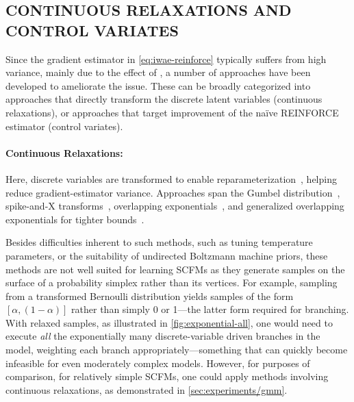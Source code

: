 \vspace*{-1ex}
\subsection{CONTINUOUS RELAXATIONS AND CONTROL VARIATES}
\vspace*{-1ex}
\label{sec:background/control-variates}

Since the gradient estimator in \cref{eq:iwae-reinforce} typically suffers from high variance, mainly due to the effect of , a number of approaches have been developed to ameliorate the issue.
%
These can be broadly categorized into approaches that directly transform the discrete latent variables (continuous relaxations), or approaches that target improvement of the na\"ive \acrshort{REINFORCE} estimator (control variates).

\paragraph{Continuous Relaxations:}%
%
Here, discrete variables are transformed to enable reparameterization~\citep{kingma2014auto,rezende2014stochastic}, helping reduce gradient-estimator variance.
%
Approaches span the Gumbel distribution~\citep{maddison2017concrete,jang2017categorical}, spike-and-X transforms~\citep{rolfe2016dvae}, overlapping exponentials~\citep{vahdat2018dvaepp}, and generalized overlapping exponentials for tighter bounds~\citep{vahdat2018dvaehash}.

Besides difficulties inherent to such methods, such as tuning temperature parameters, or the suitability of undirected Boltzmann machine priors, these methods are not well suited for learning \glspl{SCFM} as they generate samples on the surface of a probability simplex rather than its vertices.
%
For example, sampling from a transformed Bernoulli distribution yields samples of the form \([\alpha, (1 - \alpha)]\) rather than simply 0 or 1---the latter form required for branching.
%
With relaxed samples, as illustrated in \cref{fig:exponential-all}, one would need to execute \emph{all} the exponentially many discrete-variable driven branches in the model, weighting each branch appropriately---something that can quickly become infeasible for even moderately complex models.
%
However, for purposes of comparison, for relatively simple \glspl{SCFM}, one could apply methods involving continuous relaxations, as demonstrated in \cref{sec:experiments/gmm}.

